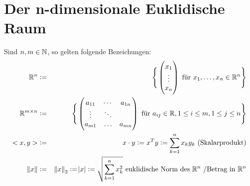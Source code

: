 \section{Der n-dimensionale Euklidische Raum}
Sind $n, m \in \mathbb{N}$, so gelten folgende Bezeichungen:
\begin{eqnarray*}
    \mathbb{R}^n &:=& \Bigg\{
        \begin{pmatrix}
            x_1\\
            \vdots \\
            x_n
        \end{pmatrix}
        \text{ für }
        x_1, \ldots, x_n \in \mathbb{R}^n
    \Bigg\} \\
    \mathbb{R}^{m \times n} &:=& \Bigg\{
        \begin{pmatrix}
            a_{11} & \cdots & a_{1n}\\
            \vdots & \ddots\\
            a_{m1} & \ldots & a_{mn}
        \end{pmatrix}
        \text{ für }
        a_{ij} \in \mathbb{R}, 1 \leq i \leq m, 1 \leq j \leq n
    \Bigg\}\\
    <x, y> &:=& x \cdot y := x^T y := \sum_{k=1}^n x_k y_k \text{ (Skalarprodukt)}\\
    \Vert x \Vert &:=& {\Vert x \Vert}_2 := \abs{x} := \sqrt{\sum_{k=1}^n x_k^2}
    \text{ euklidische Norm des }\mathbb{R}^n\text{ /Betrag in }\mathbb{R}^n
\end{eqnarray*}
